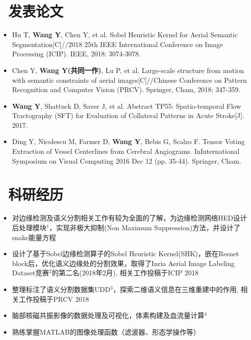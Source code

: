 \documentclass{resume}
\begin{document}
\section{\faBookmark\ 发表论文}
\begin{itemize}[parsep=0.5ex]
	\item Hu T, \textbf{Wang Y}, Chen Y, et al. Sobel Heuristic Kernel for Aerial Semantic Segmentation[C]//2018 25th IEEE International Conference on Image Processing (ICIP). IEEE, 2018: 3074-3078.
	\item Chen Y, \textbf{Wang Y(共同一作)}, Lu P, et al. Large-scale structure from motion with semantic constraints of aerial images[C]//Chinese Conference on Pattern Recognition and Computer Vision (PRCV). Springer, Cham, 2018: 347-359.
	\item \textbf{Wang Y}, Shattuck D, Saver J, et al. Abstract TP55: Spatio-temporal Flow Tractography (SFT) for Evaluation of Collateral Patterns in Acute Stroke[J]. 2017.
	\item Ding Y, Nicolescu M, Farmer D, \textbf{Wang Y}, Bebis G, Scalzo F. Tensor Voting Extraction of Vessel Centerlines from Cerebral Angiograms. InInternational Symposium on Visual Computing 2016 Dec 12 (pp. 35-44). Springer, Cham. 
\end{itemize}


\section{\faFlask\ 科研经历}

\begin{itemize}[parsep=0.5ex]
	\item 对边缘检测及语义分割相关工作有较为全面的了解，为边缘检测网络HED设计后处理模块$^1$，实现非极大抑制(Non Maximum Suppression)方法，并设计了snake能量方程
	\item 设计了基于Sobel边缘检测算子的Sobel Heuristic Kernel(SHK)，嵌在Resnet block后，优化语义边缘处的分割效果，取得了Inria Aerial Image Labeling Dataset竞赛$^2$的第二名(2018年2月), 相关工作投稿于ICIP 2018
	\item 整理标注了语义分割数据集UDD$^3$，探索二维语义信息在三维重建中的作用, 相关工作投稿于PRCV 2018
\end{itemize}

\begin{itemize}[parsep=0.5ex]
  \item 脑部核磁共振影像的数据处理及可视化，体素构建及血流量计算$^4$
  \item 熟练掌握MATLAB的图像处理函数（滤波器、形态学操作等）
\end{itemize}
\end{document}
